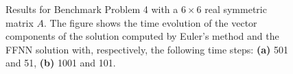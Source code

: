 \begin{figure}[H]
\centering
{}
\qquad
{}
\caption{Results for Benchmark Problem 4 with a $6\times 6$ real symmetric matrix $A$. The figure shows the time evolution of the vector components of the solution computed by Euler's method and the FFNN solution with, respectively, the following time steps: \textbf{(a)} 501 and 51, \textbf{(b)} 1001 and 101.}
\label{fig:benchrun4_comp_2}
\end{figure}

